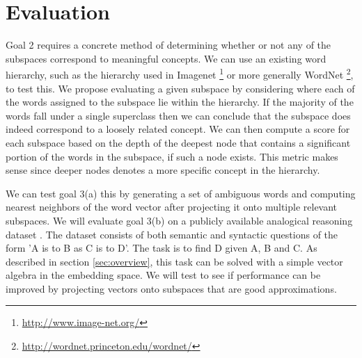 \section{Evaluation}\label{sec:evaluation}

Goal 2 requires a concrete method of determining whether or not any of the subspaces correspond to meaningful concepts. 
We can use an existing word hierarchy, such as the hierarchy used in Imagenet \footnote{\url{http://www.image-net.org/}} or more generally  WordNet \footnote{\url{http://wordnet.princeton.edu/wordnet/}}, to test this. 
We propose evaluating a given subspace by considering where each of the words assigned to the subspace lie within the hierarchy.
If the majority of the words fall under a single superclass then we can conclude that the subspace does indeed correspond to a loosely related concept. 
We can then compute a score for each subspace based on the depth of the deepest node that contains a significant portion of the words in the subspace, if such a node exists. This metric makes sense since deeper nodes denotes a more specific concept in the hierarchy. 

We can test goal 3(a) this by generating a set of ambiguous words and computing nearest neighbors of the word vector after projecting it onto multiple relevant subspaces. 
We will evaluate goal 3(b) on a publicly available analogical reasoning dataset \cite{mikolov3}. 
The dataset consists of both semantic and syntactic questions of the form 'A is to B as C is to D'.
The task is to find D given A, B and C. 
As described in section \ref{sec:overview}, this task can be solved with a simple vector algebra in the embedding space.
We will test to see if performance can be improved by projecting vectors onto subspaces that are good approximations. 
